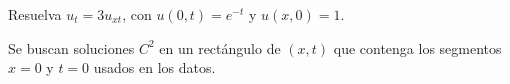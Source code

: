 Resuelva $u_t=3u_{xt}$, con $u(0,t)=e^{-t}$ y $u(x,0)=1$.

Se buscan soluciones $C^2$ en un rectángulo de $(x,t)$ que contenga los segmentos $x=0$ y $t=0$ usados en los datos.
